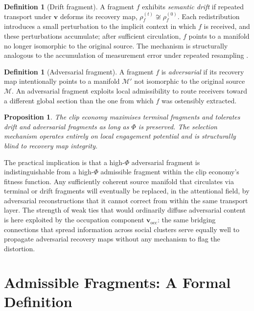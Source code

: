 \documentclass{amsart}
\theoremstyle{plain}
\newtheorem{proposition}[theorem]{Proposition}
\theoremstyle{definition}
\newtheorem{definition}[theorem]{Definition}
\theoremstyle{remark}
\newcommand{\scalar}{\Phi}
\newcommand{\vfield}{\mathbf{v}}
\newcommand{\vocc}{\mathbf{v}_{\!\text{occ}}}
\newcommand{\Man}{\mathcal{M}}
\begin{document}
\begin{definition}[Drift fragment]
  \label{def:drift}
  A fragment $f$ exhibits \emph{semantic drift} if repeated transport under
  $\vfield$ deforms its recovery map, $\rho_f^{(t)} \not\cong \rho_f^{(0)}$.
  Each redistribution introduces a small perturbation to the implicit context in
  which $f$ is received, and these perturbations accumulate; after sufficient
  circulation, $f$ points to a manifold no longer isomorphic to the original
  source.  The mechanism is structurally analogous to the accumulation of
  measurement error under repeated resampling \cite{tversky1974}.
\end{definition}

\begin{definition}[Adversarial fragment]
  \label{def:adversarial}
  A fragment $f$ is \emph{adversarial} if its recovery map intentionally points to
  a manifold $\Man'$ not isomorphic to the original source $\Man$.  An adversarial
  fragment exploits local admissibility to route receivers toward a different global
  section than the one from which $f$ was ostensibly extracted.
\end{definition}

\begin{proposition}
  \label{prop:failure-modes}
  The clip economy maximises terminal fragments and tolerates drift and adversarial
  fragments as long as $\scalar$ is preserved.  The selection mechanism operates
  entirely on local engagement potential and is structurally blind to recovery map
  integrity.
\end{proposition}

The practical implication is that a high-$\scalar$ adversarial fragment is
indistinguishable from a high-$\scalar$ admissible fragment within the clip
economy's fitness function.  Any sufficiently coherent source manifold that
circulates via terminal or drift fragments will eventually be replaced, in the
attentional field, by adversarial reconstructions that it cannot correct from
within the same transport layer.  The strength of weak ties \cite{granovetter1973}
that would ordinarily diffuse adversarial content is here exploited by the
occupation component $\vocc$: the same bridging connections that spread information
across social clusters serve equally well to propagate adversarial recovery maps
without any mechanism to flag the distortion.

\section{Admissible Fragments: A Formal Definition}
\label{sec:admissible}
\end{document}
